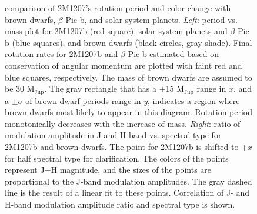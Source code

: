 \documentclass[apj]{emulateapj}
\newcommand{\bpic}{$\beta$ Pic}
\newcommand{\vsini}{$v\sin i$}
\newcommand{\mjup}{M$_{\mbox{Jup}}$}
\begin{document}
\begin{figure}
  \centering
  \caption{comparison of 2M1207's rotation period and color change
    with brown dwarfs, \bpic{} b, and solar system planets. {\em
      Left}: period vs. mass plot for 2M1207b (red square), solar
    system planets and \bpic{} b (blue squares), and brown dwarfs
    (black circles, gray shade). Final rotation rates for 2M1207b and
    \bpic{} b estimated based on conservation of angular momentum are
    plotted with faint red and blue squares, respectively. The mass of brown dwarfs are assumed
    to be 30 \mjup{}. The gray rectangle that has a $\pm$15 \mjup
    range in $x$, and a $\pm \sigma$ of brown dwarf periods range in
    $y$, indicates a region where brown dwarfs most likely to appear
    in this diagram. Rotation period monotonically decreases with the
    increase of mass. {\em Right}: ratio of modulation amplitude in J
    and H band vs. spectral type for 2M1207b and brown dwarfs. The
    point for 2M1207b is shifted to +$x$ for half spectral type for
    clarification.  The colors of the points represent J$-$H
    magnitude, and the sizes of the points are proportional to the
    J-band modulation amplitudes. The gray dashed line is the result
    of a linear fit to these points.  Correlation of J- and
    H-band modulation amplitude ratio and spectral type is shown.}
 \label{fig:5}
\end{figure}

\end{document}
